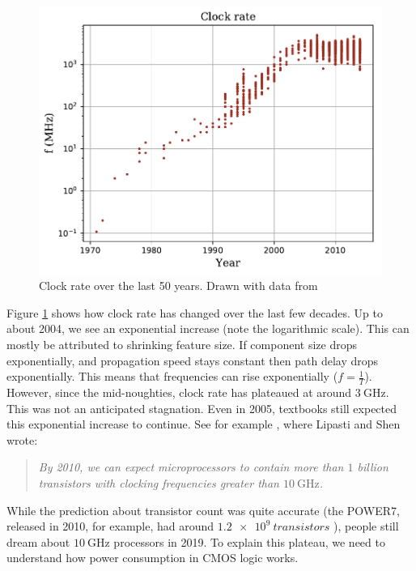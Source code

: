 \documentclass[12pt,a4paper]{article} %
\begin{document}
\begin{figure}[!h]
	\centering
	\includegraphics[width=\textwidth]{Source/ClockRate.pdf}
	\caption{Clock rate over the last 50 years. Drawn with data from \cite{cpudb}} %
	\label{fig-clockrate}
\end{figure}%
Figure \ref{fig-clockrate} shows how clock rate has changed over the last few decades. Up to about 2004, we see an exponential increase (note the logarithmic scale). This can mostly be attributed to shrinking feature size. If component size drops exponentially, and propagation speed stays constant then path delay drops exponentially. This means that frequencies can rise exponentially ($f=\frac{1}{T}$). \\
However, since the mid-noughties, clock rate has plateaued at around $\SI{3}{\GHz}$. This was not an anticipated stagnation. Even in 2005, textbooks still expected this exponential increase to continue. See for example \cite[p.~3]{lipastiShen}, where Lipasti and Shen wrote:
\begin{quote}
	\textit{By 2010, we can expect microprocessors to contain more than $1$ billion transistors with clocking frequencies greater than $\SI{10}{\GHz}$.}
\end{quote}
While the prediction about transistor count was quite accurate (the POWER7, released in 2010, for example, had around $\SI{1.2e9}{transistors}$ \cite[p.~44]{power7-2}), people still dream about $\SI{10}{\GHz}$ processors in 2019. To explain this plateau, we need to understand how power consumption in CMOS logic works.\\ 
\end{document}
